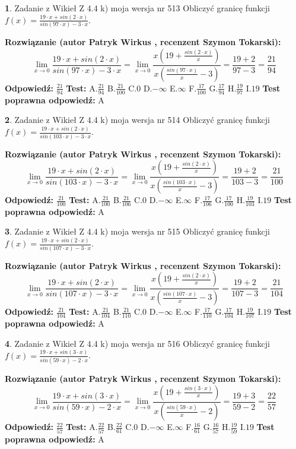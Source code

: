 \documentclass[12pt, a4paper]{article}
\theoremstyle{definition} %
\newtheorem{zad}{}
\newcommand{\zadStart}[1]{\begin{zad}#1\newline}
\newcommand{\zadStop}{\end{zad}}
\newcommand{\rozwStart}[2]{\noindent \textbf{Rozwiązanie (autor #1 , recenzent #2): }\newline}
\newcommand{\rozwStop}{\newline}
\newcommand{\odpStart}{\noindent \textbf{Odpowiedź:}\newline}
\newcommand{\odpStop}{\newline}
\newcommand{\testStart}{\noindent \textbf{Test:}\newline}
\newcommand{\testStop}{\newline}
\newcommand{\kluczStart}{\noindent \textbf{Test poprawna odpowiedź:}\newline}
\newcommand{\kluczStop}{\newline}
\begin{document}
\zadStart{Zadanie z Wikieł Z 4.4 k) moja wersja nr 513}
Obliczyć granicę funkcji $f(x)=\frac{19\cdot x +sin(2\cdot x)}{sin(97\cdot x) -3\cdot x}$.
\zadStop
\rozwStart{Patryk Wirkus}{Szymon Tokarski}
$$\lim\limits_{x\to 0}\frac{19\cdot x +sin(2\cdot x)}{sin(97\cdot x) -3\cdot x}
=\lim\limits_{x\to 0}\frac{x(19+\frac{sin(2\cdot x)}{x})}{x(\frac{sin(97\cdot x)}{x}-3)}
=\frac{19+2}{97-3} = \frac{21}{94}$$
\rozwStop
\odpStart
$\frac{21}{94}$
\odpStop
\testStart
A.$\frac{21}{94}$
B.$\frac{21}{100}$
C.$0$
D.$-\infty$
E.$\infty$
F.$\frac{17}{100}$
G.$\frac{17}{94}$
H.$\frac{19}{97}$
I.$19$
\testStop
\kluczStart
A
\kluczStop



\zadStart{Zadanie z Wikieł Z 4.4 k) moja wersja nr 514}
Obliczyć granicę funkcji $f(x)=\frac{19\cdot x +sin(2\cdot x)}{sin(103\cdot x) -3\cdot x}$.
\zadStop
\rozwStart{Patryk Wirkus}{Szymon Tokarski}
$$\lim\limits_{x\to 0}\frac{19\cdot x +sin(2\cdot x)}{sin(103\cdot x) -3\cdot x}
=\lim\limits_{x\to 0}\frac{x(19+\frac{sin(2\cdot x)}{x})}{x(\frac{sin(103\cdot x)}{x}-3)}
=\frac{19+2}{103-3} = \frac{21}{100}$$
\rozwStop
\odpStart
$\frac{21}{100}$
\odpStop
\testStart
A.$\frac{21}{100}$
B.$\frac{21}{106}$
C.$0$
D.$-\infty$
E.$\infty$
F.$\frac{17}{106}$
G.$\frac{17}{100}$
H.$\frac{19}{103}$
I.$19$
\testStop
\kluczStart
A
\kluczStop



\zadStart{Zadanie z Wikieł Z 4.4 k) moja wersja nr 515}
Obliczyć granicę funkcji $f(x)=\frac{19\cdot x +sin(2\cdot x)}{sin(107\cdot x) -3\cdot x}$.
\zadStop
\rozwStart{Patryk Wirkus}{Szymon Tokarski}
$$\lim\limits_{x\to 0}\frac{19\cdot x +sin(2\cdot x)}{sin(107\cdot x) -3\cdot x}
=\lim\limits_{x\to 0}\frac{x(19+\frac{sin(2\cdot x)}{x})}{x(\frac{sin(107\cdot x)}{x}-3)}
=\frac{19+2}{107-3} = \frac{21}{104}$$
\rozwStop
\odpStart
$\frac{21}{104}$
\odpStop
\testStart
A.$\frac{21}{104}$
B.$\frac{21}{110}$
C.$0$
D.$-\infty$
E.$\infty$
F.$\frac{17}{110}$
G.$\frac{17}{104}$
H.$\frac{19}{107}$
I.$19$
\testStop
\kluczStart
A
\kluczStop



\zadStart{Zadanie z Wikieł Z 4.4 k) moja wersja nr 516}
Obliczyć granicę funkcji $f(x)=\frac{19\cdot x +sin(3\cdot x)}{sin(59\cdot x) -2\cdot x}$.
\zadStop
\rozwStart{Patryk Wirkus}{Szymon Tokarski}
$$\lim\limits_{x\to 0}\frac{19\cdot x +sin(3\cdot x)}{sin(59\cdot x) -2\cdot x}
=\lim\limits_{x\to 0}\frac{x(19+\frac{sin(3\cdot x)}{x})}{x(\frac{sin(59\cdot x)}{x}-2)}
=\frac{19+3}{59-2} = \frac{22}{57}$$
\rozwStop
\odpStart
$\frac{22}{57}$
\odpStop
\testStart
A.$\frac{22}{57}$
B.$\frac{22}{61}$
C.$0$
D.$-\infty$
E.$\infty$
F.$\frac{16}{61}$
G.$\frac{16}{57}$
H.$\frac{19}{59}$
I.$19$
\testStop
\kluczStart
A
\kluczStop
\end{document}
